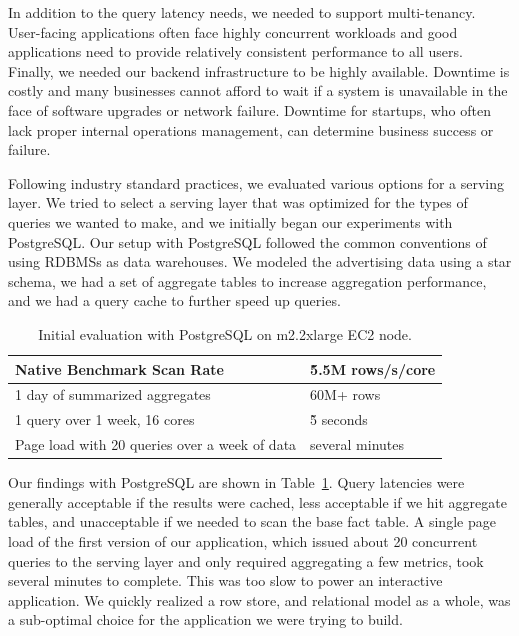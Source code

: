 \documentclass{vldb}
\begin{document}
In addition to the query latency needs, we needed to support multi-tenancy.
User-facing applications often face highly concurrent workloads and good
applications need to provide relatively consistent performance to all users.
Finally, we needed our backend infrastructure to be highly available. Downtime
is costly and many businesses cannot afford to wait if a system is unavailable
in the face of software upgrades or network failure. Downtime for startups, who
often lack proper internal operations management, can determine business
success or failure.

Following industry standard practices, we evaluated various options for a
serving layer. We tried to select a serving layer that was optimized for the
types of queries we wanted to make, and we initially began our experiments with
PostgreSQL\cite{stonebraker1987extendability}. Our setup with PostgreSQL
followed the common conventions of using RDBMSs as data warehouses. We modeled
the advertising data using a star schema, we had a set of aggregate tables to
increase aggregation performance, and we had a query cache to further speed up
queries.

\begin{table}
\centering
\scriptsize\begin{tabular}{| l | l |}
  \hline
  Native Benchmark Scan Rate & \~5.5M rows/s/core \\ \hline
  1 day of summarized aggregates & 60M+ rows \\ \hline
  1 query over 1 week, 16 cores & \~5 seconds \\ \hline
  Page load with 20 queries over a week of data & several minutes \\ \hline
\end{tabular}
\normalsize
\caption{Initial evaluation with PostgreSQL on m2.2xlarge EC2 node.}
\label{tab:postgres_results}
\end{table}

Our findings with PostgreSQL are shown in Table~\ref{tab:postgres_results}.
Query latencies were generally acceptable if the results were cached, less
acceptable if we hit aggregate tables, and unacceptable if we needed to scan
the base fact table. A single page load of the first version of our
application, which issued about 20 concurrent queries to the serving layer and
only required aggregating a few metrics, took several minutes to complete. This
was too slow to power an interactive application. We quickly realized a row
store, and relational model as a whole, was a sub-optimal choice for the
application we were trying to build.
\end{document}
